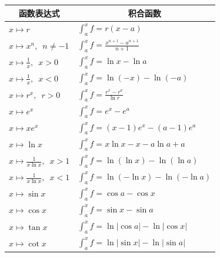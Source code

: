 \documentclass[12pt,UTF8]{ctexbook}
\begin{document}
\begin{appendix}
\begin{center}
    \renewcommand{\arraystretch}{2}
    \setlength{\extrarowheight}{-3pt}
    \begin{longtable}{|l|l|}
        \hline \multicolumn{1}{|c|}{\textbf{函数表达式}} & \multicolumn{1}{c|}{\textbf{积合函数}} \\[4pt] 
        \hline    
        $\displaystyle x\mapsto r$ & $\displaystyle \int_a^x f = r(x - a)$ \\[4pt]
        \hline    
        $\displaystyle x\mapsto x^n,\,\,\,n\neq -1$ & $\displaystyle \int_a^x f = \frac{x^{n+1} - a^{n+1}}{n+1}$ \\[4pt]
        \hline    
        $\displaystyle x\mapsto \frac{1}{x}, \,\,\, x > 0$ & $\displaystyle \int_a^x f = \ln{x} - \ln{a}$ \\[4pt]
        \hline    
        $\displaystyle x\mapsto \frac{1}{x}, \,\,\, x < 0$ & $\displaystyle \int_a^x f = \ln{(-x)} - \ln{(-a)}$ \\[4pt]
        \hline
        $\displaystyle x\mapsto r^x,\,\,\, r>0$ & $\displaystyle \int_a^x f = \frac{r^x - r^a}{\ln{r}}$ \\[4pt]
        \hline
        $\displaystyle x\mapsto e^x$ & $\displaystyle \int_a^x f = e^x - e^a$ \\[4pt]
        \hline    
        $\displaystyle x\mapsto xe^x$ & $\displaystyle \int_a^x f = (x - 1)e^x - (a - 1)e^a$ \\[4pt]
        \hline
        $\displaystyle x\mapsto \ln{x}$ & $\displaystyle \int_a^x f = x\ln{x} - x - a\ln{a} + a$ \\[4pt]
        \hline
        $\displaystyle x\mapsto \frac{1}{x\ln{x}},\,\,\, x>1$ & $\displaystyle \int_a^x f = \ln{(\ln{x})} - \ln{(\ln{a})}$ \\[4pt]
        \hline
        $\displaystyle x\mapsto \frac{1}{x\ln{x}},\,\,\, x<1$ & $\displaystyle \int_a^x f = \ln{(-\ln{x})} - \ln{(-\ln{a})}$ \\[4pt]
        \hline    
        $\displaystyle x\mapsto \sin{x}$ & $\displaystyle \int_a^x f = \cos{a} - \cos{x}$ \\[4pt]
        \hline    
        $\displaystyle x\mapsto \cos{x}$ & $\displaystyle \int_a^x f = \sin{x} - \sin{a}$ \\[4pt]
        \hline    
        $\displaystyle x\mapsto \tan{x}$ & $\displaystyle \int_a^x f = \ln{|\cos{a}|} - \ln{|\cos{x}|}$ \\[4pt]
        \hline    
        $\displaystyle x\mapsto \cot{x}$ & $\displaystyle \int_a^x f = \ln{|\sin{x}|} - \ln{|\sin{a}|}$ \\[4pt]

\end{longtable}
\end{center}
\end{appendix}
\end{document}
